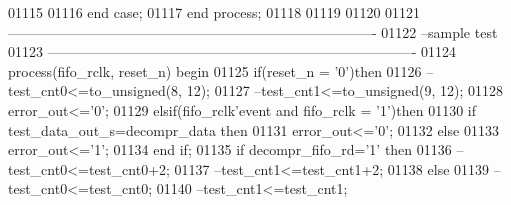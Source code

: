 \begin{DoxyCode}
01115         
01116       \textcolor{keywordflow}{end} \textcolor{keywordflow}{case};
01117 \textcolor{keywordflow}{end} \textcolor{keywordflow}{process};  
01118 
01119 
01120 
01121 \textcolor{keyword}{-------------------------------------------------------------------------------}
01122 \textcolor{keyword}{--sample test}
01123 \textcolor{keyword}{-------------------------------------------------------------------------------}
01124 \textcolor{keywordflow}{process}(fifo_rclk, reset_n) \textcolor{keywordflow}{begin}
01125     \textcolor{keywordflow}{if}\textcolor{vhdlchar}{(}\textcolor{vhdlchar}{reset_n} \textcolor{vhdlchar}{=} \textcolor{vhdlchar}{'}\textcolor{vhdllogic}{}\textcolor{vhdllogic}{0}\textcolor{vhdlchar}{'}\textcolor{vhdlchar}{)}\textcolor{keywordflow}{then}
01126 \textcolor{keyword}{        --test\_cnt0<=to\_unsigned(8, 12);}
01127 \textcolor{keyword}{        --test\_cnt1<=to\_unsigned(9, 12);}
01128         \textcolor{vhdlchar}{error_out}\textcolor{vhdlchar}{<=}\textcolor{vhdlchar}{'}\textcolor{vhdllogic}{}\textcolor{vhdllogic}{0}\textcolor{vhdlchar}{'};
01129     \textcolor{keywordflow}{elsif}\textcolor{vhdlchar}{(}\textcolor{vhdlchar}{fifo_rclk}\textcolor{vhdlchar}{'}\textcolor{vhdlkeyword}{event} \textcolor{keywordflow}{and} \textcolor{vhdlchar}{fifo_rclk} \textcolor{vhdlchar}{=} \textcolor{vhdlchar}{'}\textcolor{vhdllogic}{}\textcolor{vhdllogic}{1}\textcolor{vhdlchar}{'}\textcolor{vhdlchar}{)}\textcolor{keywordflow}{then}
01130      \textcolor{keywordflow}{if} \textcolor{vhdlchar}{test_data_out_s}\textcolor{vhdlchar}{=}\textcolor{vhdlchar}{decompr_data} \textcolor{keywordflow}{then} 
01131        \textcolor{vhdlchar}{error_out}\textcolor{vhdlchar}{<=}\textcolor{vhdlchar}{'}\textcolor{vhdllogic}{}\textcolor{vhdllogic}{0}\textcolor{vhdlchar}{'};
01132      \textcolor{keywordflow}{else} 
01133       \textcolor{vhdlchar}{error_out}\textcolor{vhdlchar}{<=}\textcolor{vhdlchar}{'}\textcolor{vhdllogic}{}\textcolor{vhdllogic}{1}\textcolor{vhdlchar}{'};
01134      \textcolor{keywordflow}{end} \textcolor{keywordflow}{if}; 
01135         \textcolor{keywordflow}{if} \textcolor{vhdlchar}{decompr_fifo_rd}\textcolor{vhdlchar}{=}\textcolor{vhdlchar}{'}\textcolor{vhdllogic}{}\textcolor{vhdllogic}{1}\textcolor{vhdlchar}{'} \textcolor{keywordflow}{then} 
01136 \textcolor{keyword}{            --test\_cnt0<=test\_cnt0+2;}
01137 \textcolor{keyword}{            --test\_cnt1<=test\_cnt1+2;}
01138             \textcolor{keywordflow}{else}
01139 \textcolor{keyword}{            --test\_cnt0<=test\_cnt0;}
01140 \textcolor{keyword}{            --test\_cnt1<=test\_cnt1; }

\end{DoxyCode}
